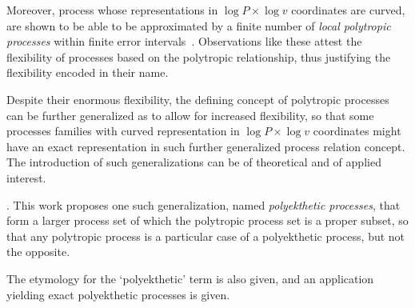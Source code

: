     Moreover, process whose representations in $\log P \times \log v$  coordinates  are  curved,
    are shown to be able to be  approximated  by  a  finite  number  of  \emph{local  polytropic
    processes} within  finite  error  intervals~\cite{2020-NaaktgeborenC-engrXiv}.  Observations
    like these attest the flexibility of processes based on the  polytropic  relationship,  thus
    justifying the flexibility encoded in their name.

    Despite their enormous flexibility, the defining concept  of  polytropic  processes  can  be
    further generalized as to allow for increased flexibility, so that some  processes  families
    with curved representation in $\log P  \times  \log  v$  coordinates  might  have  an  exact
    representation in such further generalized process relation  concept.  The  introduction  of
    such generalizations can be of theoretical and of applied interest.

    .  This  work  proposes  one  such
    generalization, named \emph{polyekthetic processes}, that form a larger process set of which
    the polytropic process set is  a  proper  subset,  so  that  any  polytropic  process  is  a
    particular case of a polyekthetic process, but not the opposite.

    The etymology for the `polyekthetic' term is also given, and an application  yielding  exact
    polyekthetic processes is given.


